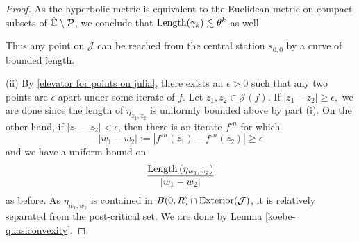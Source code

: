 \begin{proof}
As the hyperbolic metric is equivalent to the Euclidean metric on compact subsets
of $\hat{\mathbb C} \setminus \operatorname{\mathcal P}$,
we conclude that $\operatorname{Length}(\gamma_k) \lesssim \theta^k$ as well.

Thus any point on $\mathcal J$ can be reached from the central station 
$s_{0,0}$ by a curve of bounded length.

(ii) By \cref{elevator for points on julia}, 
there exists an $\epsilon>0$ such that any two points are $\epsilon$-apart 
under some iterate of $f$. 
Let $z_{1},z_{2}\in\mathcal{J}(f)$. If $\left|z_{1}-z_{2}\right|\geq\epsilon,$ 
we are done since the length of $\eta_{z_1,z_2}$ is uniformly bounded above by part (i).
On the other hand, if 
$\left|z_{1}-z_{2}\right|<\epsilon$,
then there is an iterate $f^{\circ n}$ for which
\begin{equation}
	|w_1-w_2|:=\left|f^{\circ n}(z_{1})-f^{\circ n}(z_{2})\right|\geq\epsilon
\end{equation}
and we have a uniform bound on
$$\frac{\operatorname{Length}\left(\eta_{w_1,w_2}\right)}{|w_1-w_2|}$$ as before.
As $\eta_{w_1, w_2}$ is contained in $B(0,R) \cap \operatorname{Exterior}(\mathcal J)$, it is relatively separated from the post-critical set. We are done by Lemma \ref{koebe-quasiconvexity}.
\end{proof}

